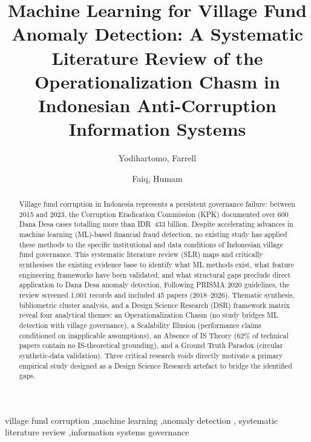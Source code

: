 \documentclass[3p,times,procedia]{elsarticle}
\begin{document}
\begin{frontmatter}


\title{Machine Learning for Village Fund Anomaly Detection: A Systematic Literature Review of the Operationalization Chasm in Indonesian Anti-Corruption Information Systems}

\author[a]{Yodihartomo, Farrell}
\author[b]{Faiq, Humam}
\address[a]{Bina Nusantara University}
\address[b]{Komisi Pemberantasan Korupsi}

\begin{abstract}
Village fund corruption in Indonesia represents a persistent governance failure: between
2015 and 2023, the Corruption Eradication Commission (KPK) documented over 600 Dana Desa
cases totalling more than IDR~433 billion. Despite accelerating advances in machine
learning (ML)-based financial fraud detection, no existing study has applied these methods
to the specific institutional and data conditions of Indonesian village fund governance.
This systematic literature review (SLR) maps and critically synthesises the existing
evidence base to identify what ML methods exist, what feature engineering frameworks have
been validated, and what structural gaps preclude direct application to Dana Desa anomaly
detection. Following PRISMA 2020 guidelines, the review screened 1,001 records and
included 45 papers (2018--2026). Thematic synthesis, bibliometric cluster analysis, and a
Design Science Research (DSR) framework matrix reveal four analytical themes: an
Operationalization Chasm (no study bridges ML detection with village governance), a
Scalability Illusion (performance claims conditioned on inapplicable assumptions), an
Absence of IS Theory (62\% of technical papers contain no IS-theoretical grounding), and
a Ground Truth Paradox (circular synthetic-data validation). Three critical research voids
directly motivate a primary empirical study designed as a Design Science Research artefact
to bridge the identified gaps.
\end{abstract}

\begin{keyword}
village fund corruption \sep machine learning \sep anomaly detection \sep
systematic literature review \sep information systems governance
\end{keyword}

\end{frontmatter}
\end{document}
